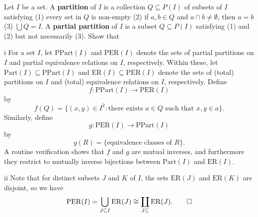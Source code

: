 \begin{exercise}
Let \(I\) be a set.
A \textbf{partition} of \(I\) is a collection \(Q \subseteq P(I)\) of subsets of \(I\) satisfying (1) every set in \(Q\) is non-empty (2) if \(a, b \in Q\) and \(a \cap b \neq \emptyset\), then \(a = b\) (3) \(\bigcup Q = I\).
A \textbf{partial partition} of \(I\) is a subset \(Q \subseteq P(I)\) satisfying (1) and (2) but not necessarily (3).
Show that
\end{exercise}

\begin{partsolution}{i}
For a set \(I\), let \(\mathrm{PPart}(I)\) and \(\mathrm{PER}(I)\) denote the sets of partial partitions on \(I\) and partial equivalence relations on \(I\), respectively.
Within these, let \(\mathrm{Part}(I) \subseteq \mathrm{PPart}(I)\) and \(\mathrm{ER}(I) \subseteq \mathrm{PER}(I)\) denote the sets of (total) partitions on \(I\) and (total) equivalence relations on \(I\), respectively.
Define
\begin{equation*}
f : \mathrm{PPart}(I) \to \mathrm{PER}(I)
\end{equation*}
by
\begin{equation*}
f(Q) = \big\{(x, y) \in I^2 : \text{there exists \(a \in Q\) such that \(x, y \in a\)}\big\}.
\end{equation*}
Similarly, define
\begin{equation*}
g : \mathrm{PER}(I) \to \mathrm{PPart}(I)
\end{equation*}
by
\begin{equation*}
g(R) = \big\{\text{equivalence classes of \(R\)}\big\}.
\end{equation*}
A routine verification shows that \(f\) and \(g\) are mutual inverses, and furthermore they restrict to mutually inverse bijections between \(\mathrm{Part}(I)\) and \(\mathrm{ER}(I)\).
\end{partsolution}

\begin{partsolution}{ii}
Note that for distinct subsets \(J\) and \(K\) of \(I\), the sets \(\mathrm{ER}(J)\) and \(\mathrm{ER}(K)\) are disjoint, so we have
\begin{equation*}
\mathrm{PER}(I)
= \bigcup_{J \subseteq I} \mathrm{ER}(J)
\cong \coprod_{J \subseteq} \mathrm{ER}(J).
\qedhere
\end{equation*}
\end{partsolution}